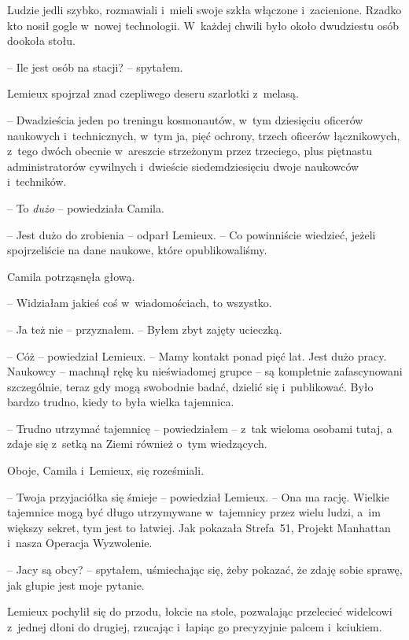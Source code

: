 \documentclass[oneside,polish,12pt,sfheadings]{mwbk}
\begin{document}
Ludzie jedli szybko, rozmawiali i~mieli swoje szkła włączone i~zacienione. Rzadko kto nosił gogle w~nowej technologii. W~każdej chwili
było około dwudziestu osób dookoła stołu.

-- Ile jest osób na stacji? -- spytałem.

Lemieux spojrzał znad czepliwego deseru szarlotki z~melasą. 

-- Dwadzieścia jeden po treningu kosmonautów, w~tym dziesięciu oficerów
naukowych i~technicznych, w~tym ja, pięć ochrony, trzech oficerów
łącznikowych, z~tego dwóch obecnie w~areszcie strzeżonym przez
trzeciego, plus piętnastu administratorów cywilnych i~dwieście
siedemdziesięciu dwoje naukowców i~techników.

-- To \emph{dużo} -- powiedziała Camila.

-- Jest dużo do zrobienia -- odparł Lemieux. -- Co powinniście wiedzieć,
jeżeli spojrzeliście na dane naukowe, które opublikowaliśmy.

Camila potrząsnęła głową. 

-- Widziałam jakieś coś w~wiadomościach, to
wszystko.

-- Ja też nie -- przyznałem. -- Byłem zbyt zajęty ucieczką.

-- Cóż -- powiedział Lemieux. -- Mamy kontakt ponad pięć lat. Jest dużo
pracy. Naukowcy -- machnął rękę ku nieświadomej grupce -- są kompletnie
zafascynowani szczególnie, teraz gdy mogą swobodnie badać, dzielić się i~publikować. Było bardzo trudno, kiedy to była wielka tajemnica.

-- Trudno utrzymać tajemnicę -- powiedziałem -- z~tak wieloma osobami tutaj,
a zdaje się z~setką na Ziemi również o~tym wiedzących.

Oboje, Camila i~Lemieux, się roześmiali.

-- Twoja przyjaciółka się śmieje -- powiedział Lemieux. -- Ona ma rację.
Wielkie tajemnice mogą być długo utrzymywane w~tajemnicy przez wielu
ludzi, a~im większy sekret, tym jest to łatwiej. Jak pokazała Strefa~51,
Projekt Manhattan i~nasza Operacja Wyzwolenie.

-- Jacy są obcy? -- spytałem, uśmiechając się, żeby pokazać, że zdaję
sobie sprawę, jak głupie jest moje pytanie.

Lemieux pochylił się do przodu, łokcie na stole, pozwalając przelecieć
widelcowi z~jednej dłoni do drugiej, rzucając i~łapiąc go precyzyjnie
palcem i~kciukiem.
\end{document}

